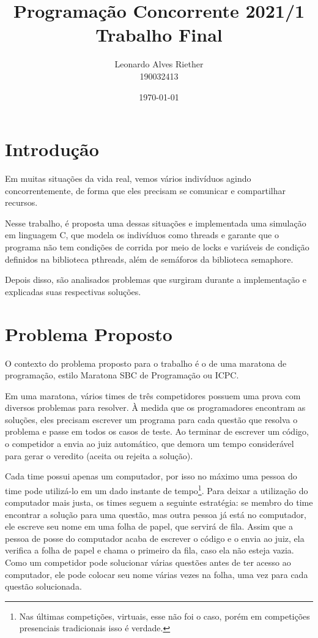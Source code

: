 \documentclass[11pt]{article}
\title{ Programação Concorrente 2021/1 \\
\Large{ Trabalho Final }}
\author{ Leonardo Alves Riether \\ 190032413 }
\date{\today}
\date{\parbox{\linewidth}{\centering%
  \today\endgraf\bigskip
  \url{https://github.com/LeoRiether/ProgConcorrenteMaratona}}}
\begin{document}
\maketitle
\pagebreak



\section{Introdução}
Em muitas situações da vida real, vemos vários indivíduos agindo concorrentemente, de forma que eles
precisam se comunicar e compartilhar recursos.

Nesse trabalho, é proposta uma dessas situações e implementada uma simulação em linguagem C, que modela
os indivíduos como threads e garante que o programa não tem condições de corrida por meio de locks e
variáveis de condição definidos na biblioteca pthreads\cite{pthreads}, além de semáforos da biblioteca
semaphore\cite{semaphore}.

Depois disso, são analisados problemas que surgiram durante a implementação e explicadas suas respectivas
soluções.


\section{Problema Proposto}
O contexto do problema proposto para o trabalho é o de uma maratona de programação, estilo Maratona
SBC de Programação\cite{maratonasbc} ou ICPC\cite{icpc}.

Em uma maratona, vários times de três competidores possuem uma prova com diversos problemas para
resolver.  À medida que os programadores encontram as soluções, eles precisam escrever um programa
para cada questão que resolva o problema e passe em todos os casos de teste. Ao terminar de escrever
um código, o competidor a envia ao juiz automático, que demora um tempo considerável para gerar o
veredito (aceita ou rejeita a solução).

Cada time possui apenas um computador, por isso no máximo uma pessoa do time pode utilizá-lo em um
dado instante de tempo\footnote{Nas últimas competições, virtuais, esse não foi o caso, porém em
competições presenciais tradicionais isso é verdade.}. Para deixar a utilização do computador mais
justa, os times seguem a seguinte estratégia: se membro do time encontrar a solução para uma questão,
mas outra pessoa já está no computador, ele escreve seu nome em uma folha de papel, que servirá de
fila. Assim que a pessoa de posse do computador acaba de escrever o código e o envia ao juiz, ela
verifica a folha de papel e chama o primeiro da fila, caso ela não esteja vazia. Como um competidor
pode solucionar várias questões antes de ter acesso ao computador, ele pode colocar seu nome várias
vezes na folha, uma vez para cada questão solucionada.
\end{document}
